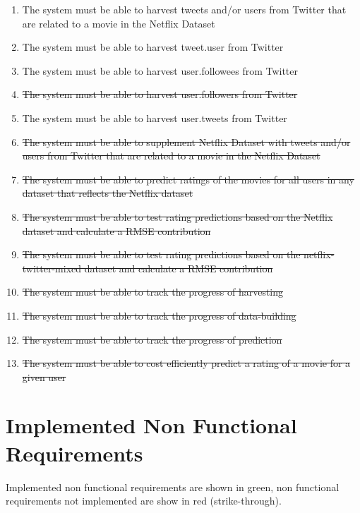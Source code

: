 \begin{enumerate}[label=\bfseries FR \arabic*:]
  \item {\color{OliveGreen}The system must be able to harvest tweets and/or users from Twitter that are related to a movie in the Netflix Dataset}
  \item {\color{OliveGreen}The system must be able to harvest tweet.user from Twitter}
  \item {\color{OliveGreen}The system must be able to harvest user.followees from Twitter}
  \item {\color{RedOrange}\st{The system must be able to harvest user.followers from Twitter}}
  \item {\color{OliveGreen}The system must be able to harvest user.tweets from Twitter}
  \item {\color{RedOrange}\st{The system must be able to supplement Netflix Dataset with tweets and/or users from Twitter that are related to a movie in the Netflix Dataset}}
  \item {\color{RedOrange}\st{The system must be able to predict ratings of the movies for all users in any dataset that reflects the Netflix dataset}}
  \item {\color{RedOrange}\st{The system must be able to test rating predictions based on the Netflix dataset and calculate a RMSE contribution}}
  \item {\color{RedOrange}\st{The system must be able to test rating predictions based on the netflix-twitter-mixed dataset and calculate a RMSE contribution}}
  \item {\color{RedOrange}\st{The system must be able to track the progress of harvesting}}
  \item {\color{RedOrange}\st{The system must be able to track the progress of data-building}}
  \item {\color{RedOrange}\st{The system must be able to track the progress of prediction}}
  \item {\color{RedOrange}\st{The system must be able to cost efficiently predict a rating of a movie for a given user}}
\end{enumerate}

\section{Implemented Non Functional Requirements}
Implemented non functional requirements are shown in green, non functional requirements not implemented are show in red (strike-through).

